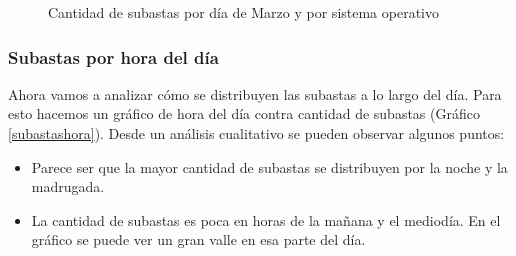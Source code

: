 \documentclass{article}
\newcommand\tab[1][1cm]{\hspace*{#1}}
\begin{document}
	\begin{figure}
			\centering
		   	\caption{Cantidad de subastas por día de Marzo y por sistema operativo}
		   	\label{subastasmarzoSO}
		\end{figure}
	\FloatBarrier
			
	\subsubsection{Subastas por hora del día}
	\tab Ahora vamos a analizar cómo se distribuyen las subastas a lo largo del día. Para esto hacemos un gráfico de hora del día contra cantidad de subastas (Gráfico \ref{subastashora}).\newline
	\tab Desde un análisis cualitativo se pueden observar algunos puntos:
	\begin{itemize}
		\item Parece ser que la mayor cantidad de subastas se distribuyen por la noche y la madrugada.
		\item La cantidad de subastas es poca en horas de la mañana y el mediodía. En el gráfico se puede ver un gran valle en esa parte del día.
	\end{itemize}
	
\end{document}
